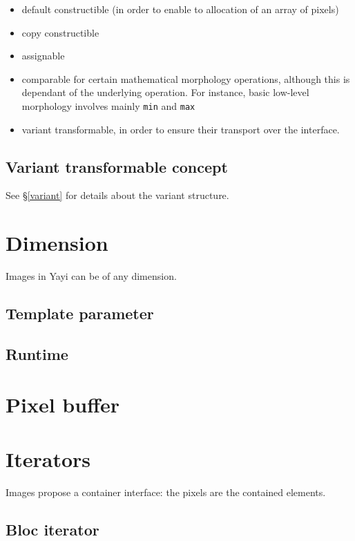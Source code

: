 \begin{itemize}
\item default constructible (in order to enable to allocation of an array of pixels)
\item copy constructible
\item assignable
\item comparable for certain mathematical morphology operations, although this is dependant of the underlying operation. For instance, basic low-level morphology involves mainly \lstinline|min| and \lstinline|max|
\item variant transformable, in order to ensure their transport over the interface. 
\end{itemize}

\subsection{Variant transformable concept}

See \S \ref{variant} for details about the variant structure. 

\section{Dimension}
\label{image:dimension}
Images in Yayi can be of any dimension. 

\subsection{Template parameter}



\subsection{Runtime}

\section{Pixel buffer}

\section{Iterators}
\label{sec:iterators}
Images propose a container interface: the pixels are the contained elements.

\subsection{Bloc iterator}
\label{sub:blocit}

